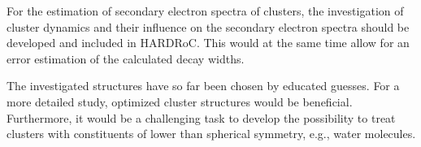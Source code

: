 For the estimation of secondary electron spectra of clusters,
the investigation of cluster dynamics and their influence on the
secondary electron spectra should be developed and included in
HARDRoC. This would at the same time allow for an error estimation of
the calculated decay widths.

The investigated structures have so far been chosen by educated guesses.
For a more detailed study, optimized cluster structures would be beneficial.
Furthermore, it would be a challenging task to develop the possibility to
treat clusters with constituents of lower than spherical symmetry, e.g.,
water molecules.
